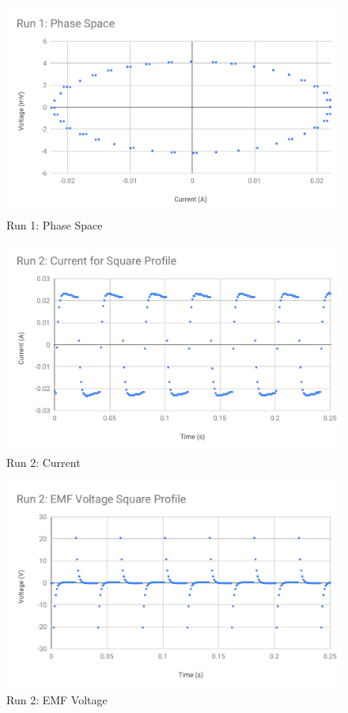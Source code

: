 \begin{figure}[ht]
	\centering
	\includegraphics[scale=0.74]{image/04-faraday/run-1-phase-space.pdf}
	\caption{Run 1: Phase Space}
	\label{figure.04.run.1.phase.space}
\end{figure}
\begin{figure}[ht]
	\centering
	\includegraphics[scale=0.74]{image/04-faraday/run-2-I.pdf}
	\caption{Run 2: Current}
	\label{figure.04.run.2.I}
\end{figure}
\begin{figure}[ht]
	\centering
	\includegraphics[scale=0.74]{image/04-faraday/run-2-V.pdf}
	\caption{Run 2: EMF Voltage}
	\label{figure.04.run.2.V}
\end{figure}
